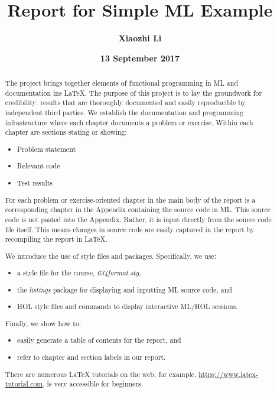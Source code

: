 \documentclass{report}
\title{Report for Simple ML Example}
\author{\textbf{Xiaozhi Li}}
\date{\textbf{13 September 2017}}
\begin{document}
\lstset{language=ML}


\maketitle{}

\begin{abstract}
  The project brings together elements of functional programming in ML
  and documentation ins \LaTeX{}.  The purpose of this project is to
  lay the groundwork for credibility: results that are thoroughly
  documented and easily reproducible by independent third parties. We
  establish the documentation and programming infrastructure where
  each chapter documents a problem or exercise.  Within each chapter
  are sections stating or showing:
  \begin{itemize}
  \item Problem statement
  \item Relevant code
  \item Test results
  \end{itemize}

  For each problem or exercise-oriented chapter in the main body of
  the report is a corresponding chapter in the Appendix containing the
  source code in ML.  This source code is not pasted into the
  Appendix.  Rather, it is input directly from the source code file
  itself. This means changes in source code are easily captured in the
  report by recompiling the report in \LaTeX{}.

We introduce the use of style files and packages. Specifically, we use:
  \begin{itemize}
  \item a style file for the course, \emph{634format.sty}, 
  \item the \emph{listings} package for displaying and inputting ML
    source code, and
  \item HOL style files and commands to display interactive ML/HOL
    sessions.
  \end{itemize}

  Finally, we show how to:
  \begin{itemize}
  \item easily generate a table of contents for the report, and
  \item refer to chapter and section labels in our report.
  \end{itemize}

  There are numerous \LaTeX{} tutorials on the web, for example,
  \url{https://www.latex-tutorial.com}, is very accessible for
  beginners.

 \end{abstract}
\end{document}
